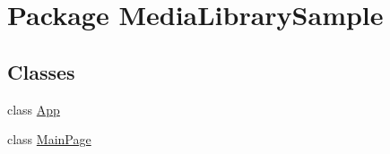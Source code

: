 \hypertarget{namespace_media_library_sample}{\section{Package Media\+Library\+Sample}
\label{namespace_media_library_sample}
}
\subsection*{Classes}
\begin{DoxyCompactItemize}
\item 
class \hyperlink{class_media_library_sample_1_1_app}{App}
\item 
class \hyperlink{class_media_library_sample_1_1_main_page}{Main\+Page}
\end{DoxyCompactItemize}
